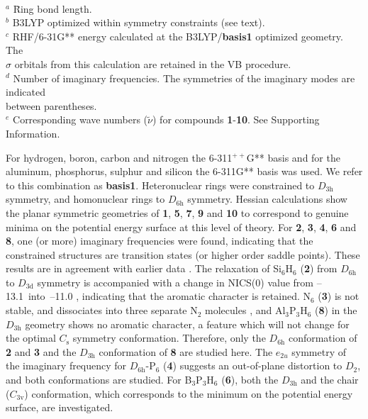 \begin{table}[htdp]
\begin{center}
\begin{tabular}{c r r r c c}
\\
\end{tabular}
\\
\flushleft
\begin{tabbing}
${}^{a}$ \= Ring bond length.\\
${}^{b}$ \> B3LYP optimized within symmetry constraints (see text).\\
${}^{c}$ \> RHF/6-31G** energy calculated at the B3LYP/\textbf{basis1} optimized geometry. The \\
              \> $\sigma$ orbitals from this calculation are retained in the VB procedure.\\
${}^{d}$ \> Number of imaginary frequencies. The symmetries of the imaginary modes are indicated\\ 
                \> between parentheses.  \\
${}^e$ \> Corresponding wave numbers ($\tilde{\nu}$) for compounds \textbf{1}-\textbf{10}. See Supporting Information. \\
\end{tabbing}
\label{ch6.table1}
\end{center}
\end{table}
For hydrogen, boron, carbon and nitrogen the \mbox{6-311$^{++}$G**} basis \cite{bs6_light,bs311ss,bspp}
and for the aluminum, phosphorus, sulphur and silicon the
\mbox{6-311G**} \cite{bs6_heavy,bs311ss} basis was used. We refer to this
combination as \textbf{basis1}. Heteronuclear rings were constrained
to $D_{\mathrm{3h}}$ symmetry, and homonuclear rings to
$D_{\mathrm{6h}}$ symmetry. Hessian calculations show the planar
symmetric geometries of \textbf{1}, \textbf{5}, \textbf{7}, \textbf{9} and
\textbf{10} to correspond to genuine minima on the potential energy
surface at this level of theory. For \textbf{2}, \textbf{3}, \textbf{4},
\textbf{6} and \textbf{8}, one (or more) imaginary frequencies were found,
indicating that the constrained structures are transition states (or higher order
saddle points). These results are in agreement with earlier
data \cite{geo1,geo2,geo3,geo4,geo5}. The relaxation of Si$_6$H$_6$ (\textbf{2}) from $D_\mathrm{6h}$
to $D_\mathrm{3d}$ symmetry is accompanied with a change in NICS(0) value from \mbox{--13.1 into
--11.0} \cite{baldridge}, indicating that the aromatic character is retained.
N$_6$ (\textbf{3}) is not stable, and dissociates into three separate N$_2$ molecules \cite{geo3},
and Al$_3$P$_3$H$_6$ (\textbf{8}) in the $D_\mathrm{3h}$ geometry shows no
aromatic character, a feature which will not change for the optimal $C_\mathrm{s}$ symmetry conformation.
Therefore, only the $D_\mathrm{6h}$ conformation of \textbf{2} and \textbf{3} and the $D_\mathrm{3h}$ conformation
of \textbf{8} are studied here. The $e_{2u}$ symmetry  of the imaginary
frequency for $D_\mathrm{6h}$-P$_6$ (\textbf{4}) suggests an out-of-plane distortion to $D_\mathrm{2}$, and
both conformations are studied. For B$_3$P$_3$H$_6$ (\textbf{6}), both the $D_\mathrm{3h}$ and the
chair ($C_\mathrm{3v}$) conformation, which corresponds to the minimum on
the potential energy surface, are investigated.

